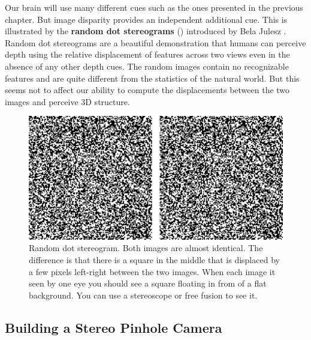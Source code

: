 Our brain will use many different cues such as the ones presented in the previous chapter. But image disparity provides an independent additional cue. This is illustrated by the {\bf random dot stereograms}
(\fig{\ref{fig:random_dot_stereogram}}) introduced by Bela Julesz \cite{Julez1971}. Random dot stereograms are a beautiful demonstration that humans can perceive depth using the relative displacement of features across two views even in the absence of any other depth cues. The random images contain no recognizable features and are quite different from the statistics of the natural world. But this seems not to affect our ability to compute the displacements between the two images and perceive 3D structure.

\begin{figure}
\centerline{
\includegraphics[width=1\linewidth]{figures/3d_scene_understanding/random_dot_stereogram.eps}
}
\caption{Random dot stereogram. Both images are almost identical. The difference is that there is a square in the middle that is displaced by a few pixels left-right between the two images. When each image it seen by one eye you should see a square floating in from of a flat background. You can use a stereoscope or free fusion to see it. %
}
\label{fig:random_dot_stereogram}
\end{figure}



\subsection{Building a Stereo Pinhole Camera}

